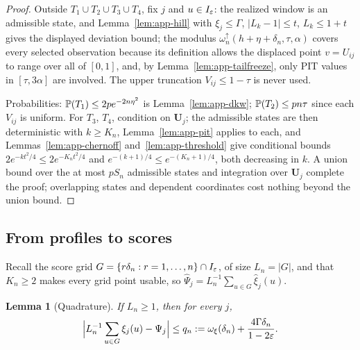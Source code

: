 \documentclass[bj,authoryear]{imsart}
\theoremstyle{plain}
\newtheorem{lemma}[theorem]{Lemma}
\begin{document}
\begin{appendix}
\begin{proof}
Outside $T_1\cup T_2\cup T_3\cup T_4$, fix $j$ and $u\in I_\varepsilon$: the realized
window is an admissible state, and
Lemma~\ref{lem:app-hill} with $\xi_j\le\Gamma$, $|L_k-1|\le t$,
$L_k\le1+t$ gives the displayed deviation bound; the modulus
$\omega_n^{\uparrow}(h+\eta+\delta_n,\tau,\alpha)$ covers every selected
observation because its definition allows the displaced point
$v=U_{ij}$ to range over all of $[0,1]$, and, by
Lemma~\ref{lem:app-tailfreeze}, only PIT values in $[\tau,3\alpha]$ are
involved.  The upper truncation $V_{ij}\le1-\tau$ is never used.

Probabilities: $\mathbb P(T_1)\le2pe^{-2n\eta^2}$ is
Lemma~\ref{lem:app-dkw}; $\mathbb P(T_2)\le pn\tau$ since each $V_{ij}$ is
uniform.  For $T_3$, $T_4$, condition on $\bm U_j$; the admissible states
are then deterministic with $k\ge K_n$,
Lemma~\ref{lem:app-pit} applies to each, and
Lemmas~\ref{lem:app-chernoff} and~\ref{lem:app-threshold} give conditional
bounds $2e^{-kt^2/4}\le2e^{-K_nt^2/4}$ and
$e^{-(k+1)/4}\le e^{-(K_n+1)/4}$, both decreasing in $k$.  A union bound
over the at most $pS_n$ admissible states and
integration over $\bm U_j$ complete the proof; overlapping states and
dependent coordinates cost nothing beyond the union bound.
\end{proof}

\subsection{From profiles to scores}\label{app:scores}

Recall the score grid $G=\{r\delta_n:r=1,\ldots,n\}\cap I_\varepsilon$, of size
$L_n=|G|$, and that $K_n\ge2$ makes every grid point usable, so
$\widehat\Psi_j=L_n^{-1}\sum_{u\in G}\widehat\xi_j(u)$.

\begin{lemma}[Quadrature]\label{lem:app-quadrature}
If $L_n\ge1$, then for every $j$,
\begin{equation}
 \Bigl|L_n^{-1}\sum_{u\in G}\xi_j(u)-\Psi_j\Bigr|
 \le q_n:=\omega_\xi(\delta_n)+\frac{4\Gamma\delta_n}{1-2\varepsilon}.
 \label{eq:A5app}
\end{equation}
\end{lemma}


\end{appendix}
\end{document}
